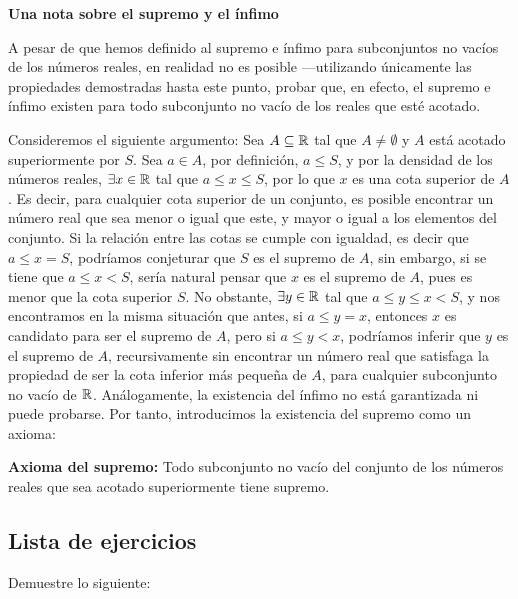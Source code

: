 \textbf{Una nota sobre el supremo y el ínfimo}

A pesar de que hemos definido al supremo e ínfimo para subconjuntos no vacíos de los números reales, en realidad no es posible ---utilizando únicamente las propiedades demostradas hasta este punto, probar que, en efecto, el supremo e ínfimo existen para todo subconjunto no vacío de los reales que esté acotado.

Consideremos el siguiente argumento: Sea $A\subseteq \mathbb{R}$ tal que $A\neq \emptyset$ y $A$ está acotado superiormente por $S$. Sea $a\in A$, por definición, $a\leq S$, y por la densidad de los números reales, $\exists x\in \mathbb{R}$ tal que $a\leq x \leq S$, por lo que $x$ es una cota superior de $A$. Es decir, para cualquier cota superior de un conjunto, es posible encontrar un número real que sea menor o igual que este, y mayor o igual a los elementos del conjunto. Si la relación entre las cotas se cumple con igualdad, es decir que $a\leq x = S$, podríamos conjeturar que $S$ es el supremo de $A$, sin embargo, si se tiene que $a\leq x < S$, sería natural pensar que $x$ es el supremo de $A$, pues es menor que la cota superior $S$. No obstante, $\exists y\in \mathbb{R}$ tal que $a\leq y \leq x<S$, y nos encontramos en la misma situación que antes, si $a\leq y = x$, entonces $x$ es candidato para ser el supremo de $A$, pero si $a\leq y < x$, podríamos inferir que $y$ es el supremo de $A$, recursivamente sin encontrar un número real que satisfaga la propiedad de ser la cota inferior más pequeña de $A$, para cualquier subconjunto no vacío de $\mathbb{R}$. Análogamente, la existencia del ínfimo no está garantizada ni puede probarse. Por tanto, introducimos la existencia del supremo como un axioma:



\textbf{Axioma del supremo:} Todo subconjunto no vacío del conjunto de los números reales que sea acotado superiormente tiene supremo.

\subsection*{Lista de ejercicios}

Demuestre lo siguiente:


